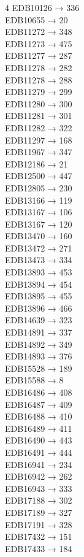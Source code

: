\begin{multicols}{4}
EDB10126 → 336\\
EDB10655 → 20\\
EDB11272 → 348\\
EDB11273 → 475\\
EDB11277 → 287\\
EDB11278 → 282\\
EDB11278 → 288\\
EDB11279 → 299\\
EDB11280 → 300\\
EDB11281 → 301\\
EDB11282 → 322\\
EDB11297 → 168\\
EDB11967 → 347\\
EDB12186 → 21\\
EDB12500 → 447\\
EDB12805 → 230\\
EDB13166 → 119\\
EDB13167 → 106\\
EDB13167 → 120\\
EDB13470 → 160\\
EDB13472 → 271\\
EDB13473 → 334\\
EDB13893 → 453\\
EDB13894 → 454\\
EDB13895 → 455\\
EDB13896 → 466\\
EDB14639 → 323\\
EDB14891 → 337\\
EDB14892 → 349\\
EDB14893 → 376\\
EDB15528 → 189\\
EDB15588 → 8\\
EDB16486 → 408\\
EDB16487 → 409\\
EDB16488 → 410\\
EDB16489 → 411\\
EDB16490 → 443\\
EDB16491 → 444\\
EDB16941 → 234\\
EDB16942 → 262\\
EDB16943 → 333\\
EDB17188 → 302\\
EDB17189 → 327\\
EDB17191 → 328\\
EDB17432 → 151\\
EDB17433 → 184\\

\end{multicols}

